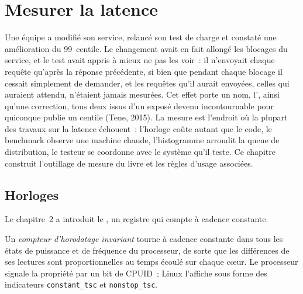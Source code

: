 \chapter{Mesurer la latence}\label{ch:ll:measuring-latency}

Une équipe a modifié son service, relancé son test de charge et constaté une amélioration du 99~centile. Le changement avait en fait allongé les
blocages du service, et le test avait appris à mieux ne pas les voir~: il n'envoyait chaque requête qu'après la réponse précédente,
si bien que pendant chaque blocage il cessait simplement de demander, et les requêtes qu'il aurait envoyées, celles qui auraient attendu,
n'étaient jamais mesurées. Cet effet porte un nom, l', ainsi qu'une correction, tous deux issus d'un exposé devenu
incontournable pour quiconque publie un centile (Tene, 2015). La mesure est l'endroit où la plupart des travaux sur la latence échouent~:
l'horloge coûte autant que le code, le benchmark observe une machine chaude, l'histogramme arrondit la queue de distribution, le testeur
se coordonne avec le système qu'il teste. Ce chapitre construit l'outillage de mesure du livre et les règles
d'usage associées.

\section{Horloges}

Le chapitre~2 a introduit le , un registre qui compte à cadence constante.

\begin{definition}\label{def:ll:measuring-latency:invtsc}
Un \emph{compteur d'horodatage invariant} tourne à cadence constante dans tous les états de puissance et
de fréquence du processeur, de sorte que les différences de ses lectures sont proportionnelles au temps écoulé sur chaque cœur.
Le processeur signale la propriété par un bit de CPUID~; Linux l'affiche sous forme des indicateurs \texttt{constant\_tsc} et
\texttt{nonstop\_tsc}.
\end{definition}


